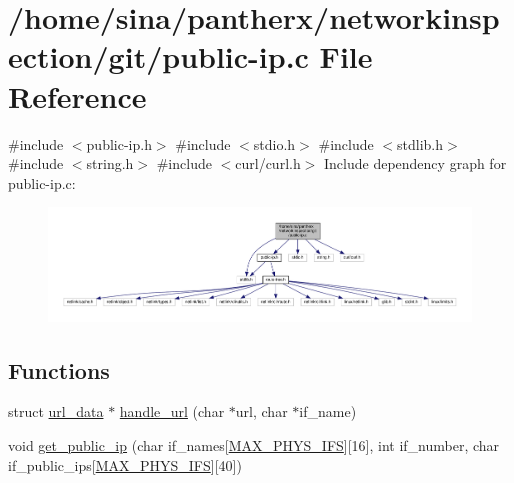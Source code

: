 \hypertarget{public-ip_8c}{}\section{/home/sina/pantherx/networkinspection/git/public-\/ip.c File Reference}
\label{public-ip_8c}
{\ttfamily \#include $<$public-\/ip.\+h$>$}\newline
{\ttfamily \#include $<$stdio.\+h$>$}\newline
{\ttfamily \#include $<$stdlib.\+h$>$}\newline
{\ttfamily \#include $<$string.\+h$>$}\newline
{\ttfamily \#include $<$curl/curl.\+h$>$}\newline
Include dependency graph for public-\/ip.c\+:\nopagebreak
\begin{figure}[H]
\begin{center}
\leavevmode
\includegraphics[width=350pt]{public-ip_8c__incl}
\end{center}
\end{figure}
\subsection*{Functions}
\begin{DoxyCompactItemize}
\item 
struct \hyperlink{structurl__data}{url\+\_\+data} $\ast$ \hyperlink{public-ip_8c_a546e9ee82a2fff0c37e173d76ab08db4}{handle\+\_\+url} (char $\ast$url, char $\ast$if\+\_\+name)
\item 
void \hyperlink{public-ip_8c_a343631cf6f2ceb1736d8b227c2cf76d3}{get\+\_\+public\+\_\+ip} (char if\+\_\+names\mbox{[}\hyperlink{route-tree_8h_a5f66955385e84e67789d731b5cad24c7}{M\+A\+X\+\_\+\+P\+H\+Y\+S\+\_\+\+I\+FS}\mbox{]}\mbox{[}16\mbox{]}, int if\+\_\+number, char if\+\_\+public\+\_\+ips\mbox{[}\hyperlink{route-tree_8h_a5f66955385e84e67789d731b5cad24c7}{M\+A\+X\+\_\+\+P\+H\+Y\+S\+\_\+\+I\+FS}\mbox{]}\mbox{[}40\mbox{]})
\end{DoxyCompactItemize}


